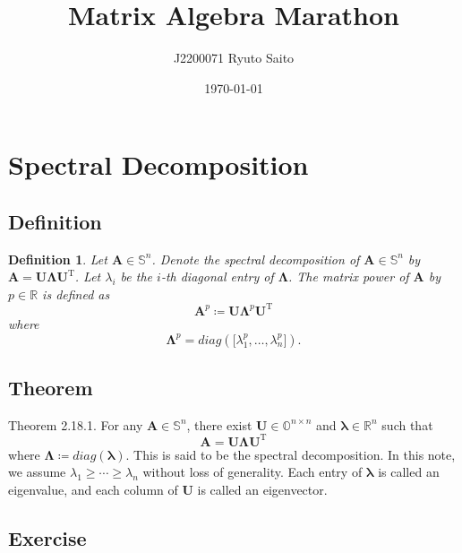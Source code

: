 \documentclass{article}
\title{Matrix Algebra Marathon}
\author{J2200071 Ryuto Saito}
\date{\today}
\theoremstyle{plain}
\newtheorem{dfn}{Definition}[subsection]
\begin{document}
\maketitle

\section{Spectral Decomposition}


\subsection{Definition}

\begin{dfn}\label{dfn1}
	Let
	$\bm{A} \in \mathbb{S}^n$. 
	Denote the spectral decomposition of $\bm{A} \in \mathbb{S}^n$
	by $\bm{A} = \bm{U} \bm{\Lambda} \bm{U}^{\mathrm{T}}$.
	Let $\lambda_i$  be the $i$-th diagonal entry of $\bm{\Lambda}$.
	The matrix power of $\bm{A}$ by $p \in \mathbb{R}$ is defined as
	\begin{equation*}
		\bm{A}^p \coloneq \bm{U} \bm{\Lambda}^p \bm{U}^{\mathrm{T}}
	\end{equation*}
	where
	\begin{equation*}
		\bm{\Lambda}^p = diag(\lbrack \lambda_1^p , \ldots , \lambda_n^p \rbrack) .
	\end{equation*}
\end{dfn}


\subsection{Theorem}

\begin{itembox}[l]{Theorem 2.18.1.}
	For any $\bm{A} \in \mathbb{S}^n$, there exist $\bm{U} \in \mathbb{O}^{n \times n}$
	and $\bm{\lambda} \in \mathbb{R}^n$ such that
	\begin{equation}
		\label{thm2181}
		\bm{A} = \bm{U} \bm{\Lambda} \bm{U}^\mathrm{T}
	\end{equation}
	where $\bm{\Lambda} \coloneq diag(\bm{\lambda})$.
	This is said to be the spectral decomposition.
	In this note, we assume $\lambda_1 \geq \cdots \geq \lambda_n$ without loss of generality.
	Each entry of $\bm{\lambda}$ is called an eigenvalue, and each column of $\bm{U}$ is called an eigenvector.
\end{itembox}


\subsection{Exercise}
\end{document}
